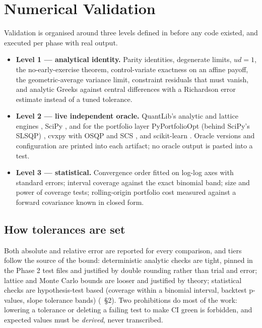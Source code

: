 \documentclass[11pt,a4paper]{article}
\begin{document}
\section{Numerical Validation}
\label{sec:validation}

Validation is organised around three levels defined in  before
any code existed, and executed per phase with real output.

\begin{itemize}
\item \textbf{Level 1 --- analytical identity.} Parity identities, degenerate limits, $ud = 1$,
the no-early-exercise theorem, control-variate exactness on an affine payoff, the geometric-average
variance limit, constraint residuals that must vanish, and analytic Greeks against central
differences with a Richardson error estimate instead of a tuned tolerance.
\item \textbf{Level 2 --- live independent oracle.} QuantLib's analytic and lattice engines
\citep{quantlib}, SciPy \citep{scipy2020}, and for the portfolio layer PyPortfolioOpt (behind
SciPy's SLSQP) \citep{pyportfolioopt}, cvxpy with OSQP and SCS \citep{cvxpy}, and scikit-learn
\citep{sklearn2011}. Oracle versions and configuration are printed into each artifact; no oracle
output is pasted into a test.
\item \textbf{Level 3 --- statistical.} Convergence order fitted on log-log axes with standard
errors; interval coverage against the exact binomial band; size and power of coverage tests;
rolling-origin portfolio cost measured against a forward covariance known in closed form.
\end{itemize}

\subsection{How tolerances are set}
Both absolute and relative error are reported for every comparison, and tiers follow the source
of the bound: deterministic analytic checks are tight, pinned in the Phase 2 test files and
justified by double rounding rather than trial and error; lattice and Monte Carlo bounds are
looser and justified by theory; statistical checks are hypothesis-test based (coverage within a
binomial interval, backtest p-values, slope tolerance bands)
(~\S2). Two prohibitions do most of the work: lowering a
tolerance or deleting a failing test to make CI green is forbidden, and expected values must be
\emph{derived}, never transcribed.
\end{document}
